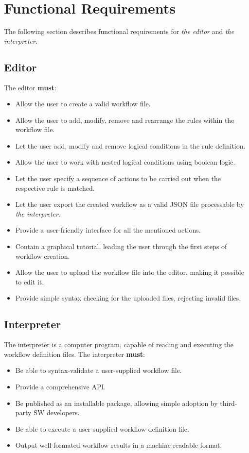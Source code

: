 \section{Functional Requirements}

The following section describes functional requirements for \textit{the editor} and \textit{the interpreter}. 

\subsection{Editor}

The editor \textbf{must}:
\begin{itemize}
    \item Allow the user to create a valid workflow file.
    \item Allow the user to add, modify, remove and rearrange the rules within the workflow file.
    \item Let the user add, modify and remove logical conditions in the rule definition.
    \item Allow the user to work with nested logical conditions using boolean logic.
    \item Let the user specify a sequence of actions to be carried out when the respective rule is matched.
    \item Let the user export the created workflow as a valid JSON file processable by \textit{the interpreter}.
    \item Provide a user-friendly interface for all the mentioned actions.
    \item Contain a graphical tutorial, leading the user through the first steps of workflow creation.
    \item Allow the user to upload the workflow file into the editor, making it possible to edit it.
    \item Provide simple syntax checking for the uploaded files, rejecting invalid files.
\end{itemize}

\subsection{Interpreter}

The interpreter is a computer program, capable of reading and executing the workflow definition files.
The interpreter \textbf{must}:
\begin{itemize}
    \item Be able to syntax-validate a user-supplied workflow file.
    \item Provide a comprehensive API.
    \item Be published as an installable package, allowing simple adoption by third-party \acs{SW} developers.
    \item Be able to execute a user-supplied workflow definition file.
    \item Output well-formated workflow results in a machine-readable format.
\end{itemize}